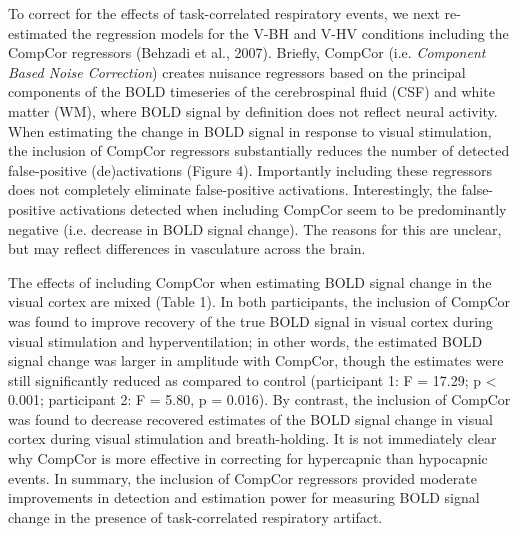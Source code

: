 \documentclass[9pt]{NEU502b-fmri}
\begin{document}
To correct for the effects of task-correlated respiratory events, we next re-estimated the regression models for the V-BH and V-HV conditions  including the CompCor regressors (Behzadi et al., 2007). Briefly, CompCor (i.e. \textit{Component Based Noise Correction}) creates nuisance regressors based on the principal components of the BOLD timeseries of the cerebrospinal fluid (CSF) and white matter (WM), where BOLD signal by definition does not reflect neural activity.  When estimating the change in BOLD signal in response to visual stimulation, the inclusion of CompCor regressors substantially reduces the number of detected false-positive (de)activations (Figure 4). Importantly including these regressors does not completely eliminate false-positive activations. Interestingly, the false-positive activations detected when including CompCor seem to be predominantly negative (i.e. decrease in BOLD signal change). The reasons for this are unclear, but may reflect differences in vasculature across the brain. 

The effects of including CompCor when estimating BOLD signal change in the visual cortex are mixed (Table 1). In both participants, the inclusion of CompCor was found to improve recovery of the true BOLD signal in visual cortex during visual stimulation and hyperventilation; in other words, the estimated BOLD signal change was larger in amplitude with CompCor, though the estimates were still significantly reduced as compared to control (participant 1: F = 17.29; p < 0.001; participant 2: F = 5.80, p = 0.016). By contrast, the inclusion of CompCor was found to decrease recovered estimates of the BOLD signal change in visual cortex during visual stimulation and breath-holding. It is not immediately clear why CompCor is more effective in correcting for hypercapnic than hypocapnic events. In summary, the inclusion of CompCor regressors provided moderate improvements in detection and estimation power for measuring BOLD signal change in the presence of task-correlated respiratory artifact.
\end{document}
